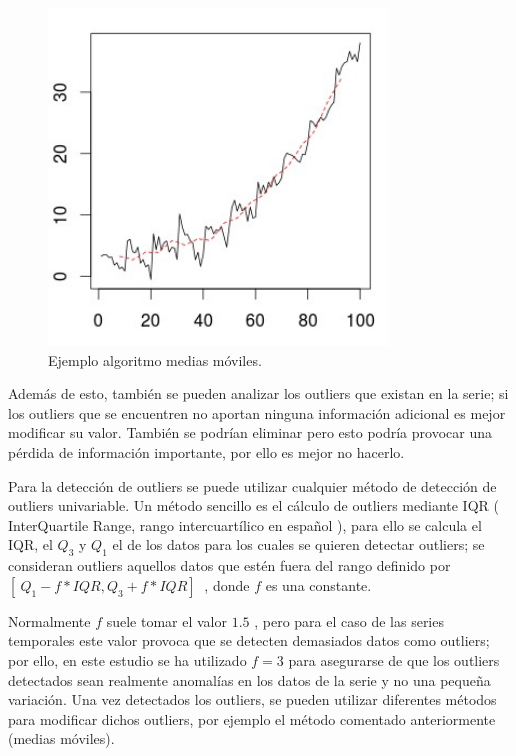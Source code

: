 \begin{figure}[H]
	\centering
	\includegraphics[width=90mm]{imagenes/moving_averages.png}
	\caption{Ejemplo algoritmo medias móviles.}
	\label{fig:51}
\end{figure}

Además de esto, también se pueden analizar los outliers que existan en la serie; si los outliers que se encuentren no aportan ninguna información adicional es mejor modificar su valor. También se podrían eliminar pero esto podría provocar una pérdida de información importante, por ello es mejor no hacerlo.\newline

Para la detección de outliers se puede utilizar cualquier método de detección de outliers univariable. Un método sencillo es el cálculo de outliers mediante IQR ( InterQuartile Range, rango intercuartílico en español ), para ello se calcula el IQR, el $Q_3$ y $Q_1$ el  de los datos para los cuales se quieren detectar outliers; se consideran outliers aquellos datos que estén fuera del rango definido por $[\ Q_1 - f*IQR, Q_3+f*IQR ]\ $ , donde $f$ es una constante.\newline

Normalmente $f$ suele tomar el valor $1.5$ , pero para el caso de las series temporales este valor provoca que se detecten demasiados datos como outliers; por ello, en este estudio se ha utilizado $f=3$ para asegurarse de que los outliers detectados sean realmente anomalías en los datos de la serie y no una pequeña variación. Una vez detectados los outliers, se pueden utilizar diferentes métodos para modificar dichos outliers, por ejemplo el método comentado anteriormente (medias móviles).\newline

